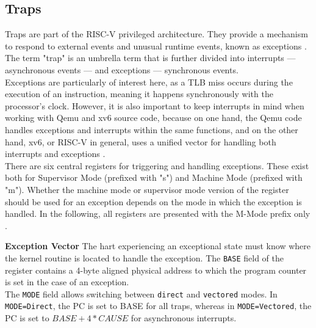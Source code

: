 \subsection{Traps}
Traps are part of the RISC-V privileged architecture. They provide a mechanism to respond to
external events and unusual runtime events, known as exceptions \cite{riscvreader}.
The term "trap" is an umbrella term that is further divided into interrupts — asynchronous events —
and exceptions — synchronous events.\\
Exceptions are particularly of interest here, as a TLB miss occurs during the execution of an instruction,
meaning it happens synchronously with the processor's clock. However, it is also important to keep interrupts
in mind when working with Qemu and xv6 source code, because on one hand, the Qemu code handles exceptions
and interrupts within the same functions, and on the other hand, xv6, or RISC-V in general, uses a unified
vector for handling both interrupts and exceptions \cite{RISCVInstructionSet}.\\

There are six central registers for triggering and handling exceptions. These exist both for
Supervisor Mode (prefixed with "s") and Machine Mode (prefixed with "m").
Whether the machine mode or supervisor mode version of the register should be used for an exception depends
on the mode in which the exception is handled. In the following, all registers are presented with the
M-Mode prefix only .


\textbf{Exception Vector} The hart  experiencing
an exceptional state must know where the kernel routine is located to handle the exception.
The \texttt{BASE} field of the register contains a 4-byte aligned physical address to which
the program counter is set in the case of an exception.\\
The \texttt{MODE} field allows switching between \texttt{direct} and \texttt{vectored} modes.
In \texttt{MODE=Direct}, the PC is set to BASE for all traps, whereas in \texttt{MODE=Vectored},
the PC is set to $BASE+4*CAUSE$ for asynchronous interrupts.\\


